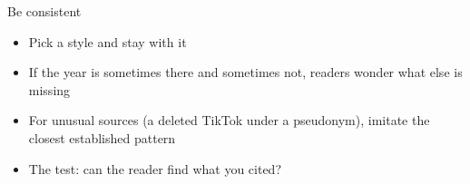 \documentclass[aspectratio=169]{beamer}
\begin{document}

\begin{frame}{Be consistent}
\begin{itemize}
  \item Pick a style and stay with it
  \item If the year is sometimes there and sometimes not, readers wonder what else is missing
  \item For unusual sources (a deleted TikTok under a pseudonym), imitate the closest established pattern
  \item The test: can the reader find what you cited?
\end{itemize}
\end{frame}

\end{document}
